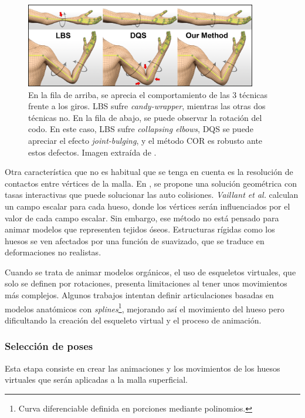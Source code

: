 \begin{figure}[ht]%
  \centering
  \includegraphics[width=0.90\textwidth]{IMG/corexample.png}
    \caption{En la fila de arriba, se aprecia el comportamiento de las 3 técnicas frente a los giros. \acs{LBS} sufre \emph{candy-wrapper}, mientras las otras dos técnicas no. En la fila de abajo, se puede observar la rotación del codo. En este caso, \acs{LBS} sufre \emph{collapsing elbows}, \acs{DQS} se puede apreciar el efecto \emph{joint-bulging}, y el método \acs{COR} es robusto ante estos defectos. Imagen extraída de \cite{le2016real}. }
    \label{fig:corexample}
\end{figure}
%
%
Otra característica que no es habitual que se tenga en cuenta es la resolución de contactos entre vértices de la malla. En \cite{Vaillant:2014}, se propone una solución geométrica con tasas interactivas que puede solucionar las auto colisiones. \emph{Vaillant et al.} calculan un campo escalar para cada hueso, donde los vértices serán influenciados por el valor de cada campo escalar. Sin embargo, ese método no está pensado para animar modelos que representen tejidos óseos. Estructuras rígidas como los huesos se ven afectados por una función de suavizado, que se traduce en deformaciones no realistas. %

Cuando se trata de animar modelos orgánicos, el uso de esqueletos virtuales, que solo se definen por rotaciones, presenta limitaciones al tener unos movimientos más complejos. Algunos trabajos intentan definir articulaciones basadas en modelos anatómicos \cite{joints} con \emph{splines}\footnote{Curva diferenciable definida en porciones mediante polinomios.}, mejorando así el movimiento del hueso pero dificultando la creación del esqueleto virtual y el proceso de animación.

\subsubsection{Selección de poses} 
\label{art:poses}
Esta etapa consiste en crear las animaciones  y los movimientos de los huesos virtuales que serán aplicadas a la malla superficial.   

